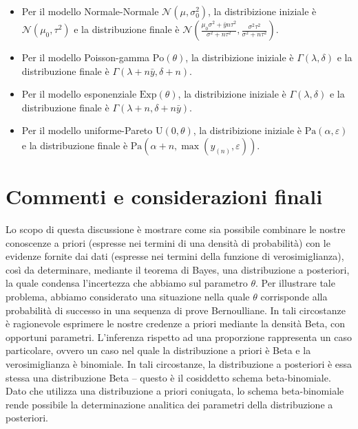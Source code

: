 \documentclass[
  11pt,
]{krantz}
\providecommand{\tightlist}{%
  \setlength{\itemsep}{0pt}\setlength{\parskip}{0pt}}
\theoremstyle{definition}
\theoremstyle{definition}
\theoremstyle{definition}
\theoremstyle{definition}
\theoremstyle{remark}
\begin{document}
\begin{itemize}
\tightlist
\item
  Per il modello Normale-Normale \(\mathcal{N}(\mu, \sigma^2_0)\), la distribizione iniziale è \(\mathcal{N}(\mu_0, \tau^2)\) e la distribuzione finale è \(\mathcal{N}\left(\frac{\mu_0\sigma^2 + \bar{y}n\tau^2}{\sigma^2 + n\tau^2}, \frac{\sigma^2\tau^2}{\sigma^2 + n\tau^2} \right)\).
\item
  Per il modello Poisson-gamma \(\text{Po}(\theta)\), la distribizione iniziale è \(\Gamma(\lambda, \delta)\) e la distribuzione finale è \(\Gamma(\lambda + n \bar{y}, \delta +n)\).
\item
  Per il modello esponenziale \(\text{Exp}(\theta)\), la distribizione iniziale è \(\Gamma(\lambda, \delta)\) e la distribuzione finale è \(\Gamma(\lambda + n, \delta +n\bar{y})\).
\item
  Per il modello uniforme-Pareto \(\text{U}(0, \theta)\), la distribizione iniziale è \(\mbox{Pa}(\alpha, \varepsilon)\) e la distribuzione finale è \(\mbox{Pa}(\alpha + n, \max(y_{(n)}, \varepsilon))\).
\end{itemize}

\hypertarget{commenti-e-considerazioni-finali-1}{%
\section*{Commenti e considerazioni finali}\label{commenti-e-considerazioni-finali-1}}


Lo scopo di questa discussione è mostrare come sia possibile combinare le nostre conoscenze a priori (espresse nei termini di una densità di probabilità) con le evidenze fornite dai dati (espresse nei termini della funzione di verosimiglianza), così da determinare, mediante il teorema di Bayes, una distribuzione a posteriori, la quale condensa l'incertezza che abbiamo sul parametro \(\theta\). Per illustrare tale problema, abbiamo considerato una situazione nella quale \(\theta\) corrisponde alla probabilità di successo in una sequenza di prove Bernoulliane. In tali circostanze è ragionevole esprimere le nostre credenze a priori mediante la densità Beta, con opportuni parametri. L'inferenza rispetto ad una proporzione rappresenta un caso particolare, ovvero un caso nel quale la distribuzione a priori è Beta e la verosimiglianza è binomiale. In tali circostanze, la distribuzione a posteriori è essa stessa una distribuzione Beta -- questo è il cosiddetto schema beta-binomiale. Dato che utilizza una distribuzione a priori coniugata, lo schema beta-binomiale rende possibile la determinazione analitica dei parametri della distribuzione a posteriori.
\end{document}
